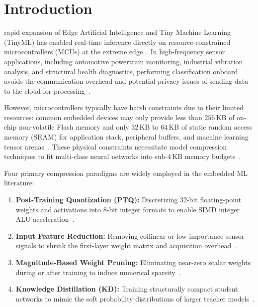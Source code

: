 \documentclass[journal,10pt]{IEEEtran}
\begin{document}
\maketitle
\IEEEdisplaynontitleabstractindextext

\section{Introduction}
 rapid expansion of Edge Artificial Intelligence and Tiny Machine Learning (TinyML) has enabled real-time inference directly on resource-constrained microcontrollers (MCUs) at the extreme edge~\cite{warden2019tinyml,ray2022review,saha2022tinyml}. In high-frequency sensor applications, including automotive powertrain monitoring, industrial vibration analysis, and structural health diagnostics, performing classification onboard avoids the communication overhead and potential privacy issues of sending data to the cloud for processing~\cite{banbury2021benchmarking,sanchez2020tinyml}.

However, microcontrollers typically have harsh constraints due to their limited resources: common embedded devices may only provide less than $256$\,KB of on-chip non-volatile Flash memory and only $32$\,KB to $64$\,KB of static random access memory (SRAM) for application stack, peripheral buffers, and machine learning tensor arenas~\cite{david2021tensorflow,liberis2021munas,lin2020mcunet,lin2021mcunetv2}. These physical constraints necessitate model compression techniques to fit multi-class neural networks into sub-4\,KB memory budgets~\cite{han2016deep,gholami2022survey,howard2017mobilenets}.

Four primary compression paradigms are widely employed in the embedded ML literature:
\begin{enumerate}
    \item \textbf{Post-Training Quantization (PTQ):} Discretizing 32-bit floating-point weights and activations into 8-bit integer formats to enable SIMD integer ALU acceleration~\cite{jacob2018quantization}.
    \item \textbf{Input Feature Reduction:} Removing collinear or low-importance sensor signals to shrink the first-layer weight matrix and acquisition overhead~\cite{sze2017efficient}.
    \item \textbf{Magnitude-Based Weight Pruning:} Eliminating near-zero scalar weights during or after training to induce numerical sparsity~\cite{blalock2020state,frankle2019lottery,hoefler2021sparsity}.
    \item \textbf{Knowledge Distillation (KD):} Training structurally compact student networks to mimic the soft probability distributions of larger teacher models~\cite{hinton2015distilling,gou2021knowledge}.
\end{enumerate}
\end{document}
